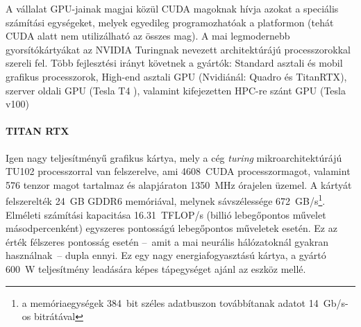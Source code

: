 A vállalat GPU-jainak magjai közül CUDA magoknak hívja azokat a speciális számítási egységeket, melyek egyedileg programozhatóak a platformon (tehát CUDA alatt nem utilizálható az összes mag). A mai legmodernebb gyorsítókártyákat az NVIDIA Turingnak nevezett architektúrájú processzorokkal szereli fel.
Több fejlesztési irányt követnek a gyártók: Standard asztali és mobil grafikus processzorok, High-end asztali GPU (Nvidiánál: Quadro és TitanRTX\cite{spec:titan-rtx}), szerver oldali GPU (Tesla T4 \cite{spec:tesla-t4}), valamint kifejezetten HPC-re szánt GPU (Tesla v100\cite{spec:tesla-v100})

\paragraph{TITAN RTX}
Igen nagy teljesítményű grafikus kártya, mely a cég \emph{turing} mikroarchitektúrájú TU102 processzorral van felszerelve, ami 4608~CUDA processzormagot, valamint 576 tenzor magot tartalmaz és alapjáraton 1350~MHz órajelen üzemel. A kártyát felszerelték 24~GB GDDR6 memóriával, melynek sávszélessége 672~GB/s\footnote{a memóriaegységek 384~bit széles adatbuszon továbbítanak adatot 14~Gb/s-os bitrátával}. Elméleti számítási kapacitása 16.31~TFLOP/s (billió lebegőpontos művelet másodpercenként) egyszeres pontosságú lebegőpontos műveletek esetén. Ez az érték félszeres pontosság esetén --~amit a mai neurális hálózatoknál gyakran használnak~-- dupla ennyi. Ez egy nagy energiafogyasztású kártya, a gyártó 600~W teljesítmény leadására képes tápegységet ajánl az eszköz mellé.

